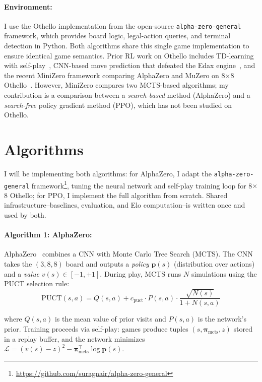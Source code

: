 \documentclass[10pt]{article}
\begin{document}
\paragraph{Environment:}
I use the Othello implementation from the open-source \texttt{alpha-zero-general} framework, which provides board logic, legal-action queries, and terminal detection in Python. Both algorithms share this single game implementation to ensure identical game semantics. Prior RL work on Othello includes TD-learning with self-play~\cite{vanderree2013reinforcement}, CNN-based move prediction that defeated the Edax engine~\cite{liskowski2017learning}, and the recent MiniZero framework comparing AlphaZero and MuZero on 8$\times$8 Othello~\cite{wu2023minizero}. However, MiniZero compares two MCTS-based algorithms; my contribution is a comparison between a \emph{search-based} method (AlphaZero) and a \emph{search-free} policy gradient method (PPO), which has not been studied on Othello.

\section{Algorithms}

I will be implementing both algorithms: for AlphaZero, I adapt the \texttt{alpha-zero-general} framework\footnote{\url{https://github.com/suragnair/alpha-zero-general}}, tuning the neural network and self-play training loop for 8$\times$8 Othello; for PPO, I implement the full algorithm from scratch. Shared infrastructure--baselines, evaluation, and Elo computation--is written once and used by both.

\paragraph{Algorithm 1: AlphaZero:}
AlphaZero~\cite{silver2017mastering} combines a CNN with Monte Carlo Tree Search (MCTS). The CNN takes the $(3,8,8)$ board and outputs a \emph{policy} $\mathbf{p}(s)$ (distribution over actions) and a \emph{value} $v(s) \in [-1,+1]$. During play, MCTS runs $N$ simulations using the PUCT selection rule:
\vspace{-0.3em}
\[
    \textstyle \text{PUCT}(s,a) = Q(s,a) + c_{\text{puct}} \cdot P(s,a) \cdot \frac{\sqrt{N(s)}}{1 + N(s,a)}
\]
\vspace{-0.5em}

\noindent where $Q(s,a)$ is the mean value of prior visits and $P(s,a)$ is the network's prior. Training proceeds via self-play: games produce tuples $(s, \boldsymbol{\pi}_{\text{mcts}}, z)$ stored in a replay buffer, and the network minimizes $\mathcal{L} = (v(s) - z)^2 - \boldsymbol{\pi}_{\text{mcts}}^\top \log \mathbf{p}(s)$.
\end{document}
